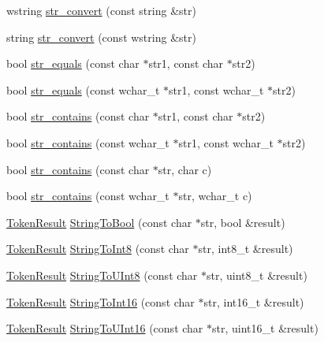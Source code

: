 \begin{DoxyCompactItemize}
\item 
wstring \hyperlink{namespacemage_a7ce8ba404dec8488d86012662043d5a1}{str\+\_\+convert} (const string \&str)
\item 
string \hyperlink{namespacemage_a3a36d9cbd56787862629cb013437217b}{str\+\_\+convert} (const wstring \&str)
\item 
bool \hyperlink{namespacemage_a4f78f15f269c1f65d4148983bc8224c5}{str\+\_\+equals} (const char $\ast$str1, const char $\ast$str2)
\item 
bool \hyperlink{namespacemage_a0013423e891bc8f522248a6a3f826681}{str\+\_\+equals} (const wchar\+\_\+t $\ast$str1, const wchar\+\_\+t $\ast$str2)
\item 
bool \hyperlink{namespacemage_a5194c40ccd591a8a8926ad7812abcd09}{str\+\_\+contains} (const char $\ast$str1, const char $\ast$str2)
\item 
bool \hyperlink{namespacemage_aac9609117e428765417683338ae8fa73}{str\+\_\+contains} (const wchar\+\_\+t $\ast$str1, const wchar\+\_\+t $\ast$str2)
\item 
bool \hyperlink{namespacemage_a42025161321117689362691b52994c3f}{str\+\_\+contains} (const char $\ast$str, char c)
\item 
bool \hyperlink{namespacemage_a95501f17ace9d4f4ca8ed15e2559ad23}{str\+\_\+contains} (const wchar\+\_\+t $\ast$str, wchar\+\_\+t c)
\item 
\hyperlink{namespacemage_a2178ba2411db5912f41b2e7698c2037d}{Token\+Result} \hyperlink{namespacemage_a4936774f925ba96c5b8d37c5e54cca02}{String\+To\+Bool} (const char $\ast$str, bool \&result)
\item 
\hyperlink{namespacemage_a2178ba2411db5912f41b2e7698c2037d}{Token\+Result} \hyperlink{namespacemage_ab7990acb6c8fb8e5eb578ef173e601f9}{String\+To\+Int8} (const char $\ast$str, int8\+\_\+t \&result)
\item 
\hyperlink{namespacemage_a2178ba2411db5912f41b2e7698c2037d}{Token\+Result} \hyperlink{namespacemage_ad3cfd1fdffefa1f3f793b7612de11770}{String\+To\+U\+Int8} (const char $\ast$str, uint8\+\_\+t \&result)
\item 
\hyperlink{namespacemage_a2178ba2411db5912f41b2e7698c2037d}{Token\+Result} \hyperlink{namespacemage_a5889574dc8d73ffa614ad8541e0b312a}{String\+To\+Int16} (const char $\ast$str, int16\+\_\+t \&result)
\item 
\hyperlink{namespacemage_a2178ba2411db5912f41b2e7698c2037d}{Token\+Result} \hyperlink{namespacemage_aa1be9dbfa0799457b0de019d451cd5ca}{String\+To\+U\+Int16} (const char $\ast$str, uint16\+\_\+t \&result)

\end{DoxyCompactItemize}
